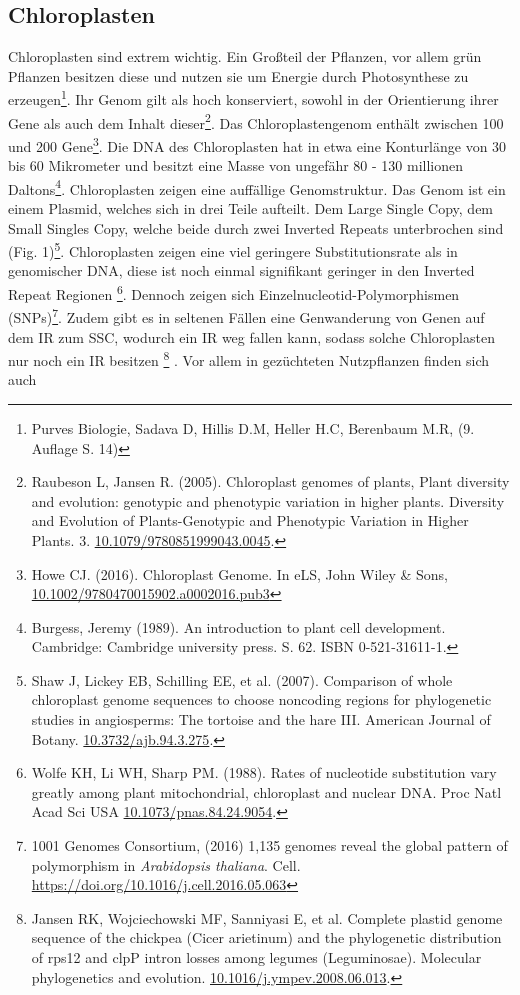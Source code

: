 \documentclass{scrartcl}
\begin{document}
\subsection{Chloroplasten}
\label{sec-2-1}
Chloroplasten sind extrem wichtig. Ein Großteil der Pflanzen, vor allem grün Pflanzen besitzen diese und nutzen sie um Energie durch Photosynthese zu erzeugen\footnote{Purves Biologie, Sadava D, Hillis D.M, Heller H.C, Berenbaum M.R, (9. Auflage S. 14)}.
Ihr Genom gilt als hoch konserviert, sowohl in der Orientierung ihrer Gene als auch dem Inhalt dieser\footnote{Raubeson L, Jansen R. (2005). Chloroplast genomes of plants, Plant diversity and evolution: genotypic and phenotypic variation in higher plants. Diversity and Evolution of Plants-Genotypic and Phenotypic Variation in Higher Plants. 3. \url{10.1079/9780851999043.0045}.}. Das Chloroplastengenom enthält zwischen 100 und 200 Gene\footnote{Howe CJ. (2016). Chloroplast Genome. In eLS, John Wiley \& Sons,  \url{10.1002/9780470015902.a0002016.pub3}}. 
Die DNA des Chloroplasten hat in etwa eine Konturlänge von 30 bis 60 Mikrometer und besitzt eine Masse von ungefähr 80 - 130 millionen Daltons\footnote{Burgess, Jeremy (1989). An introduction to plant cell development. Cambridge: Cambridge university press. S. 62. ISBN 0-521-31611-1.}.
Chloroplasten zeigen
eine auffällige Genomstruktur. Das Genom ist ein einem Plasmid, welches sich in drei Teile aufteilt. Dem Large Single Copy, dem 
Small Singles Copy, welche beide durch zwei Inverted Repeats unterbrochen sind (Fig. 1)\footnote{Shaw J, Lickey EB, Schilling EE, et al. (2007). Comparison of whole chloroplast genome sequences to choose noncoding regions for phylogenetic studies in angiosperms: The tortoise and the hare III. American Journal of Botany. \url{10.3732/ajb.94.3.275}.}. Chloroplasten zeigen eine viel geringere Substitutionsrate
als in genomischer DNA, diese ist noch einmal signifikant geringer in den Inverted Repeat Regionen \footnote{Wolfe KH, Li WH, Sharp PM. (1988). Rates of nucleotide substitution vary greatly among plant mitochondrial, chloroplast and nuclear DNA. Proc Natl Acad Sci USA \url{10.1073/pnas.84.24.9054}.}. Dennoch zeigen sich
Einzelnucleotid-Polymorphismen (SNPs)\footnote{1001 Genomes Consortium, (2016) 1,135 genomes reveal the global pattern of polymorphism in \emph{Arabidopsis thaliana}. Cell. \url{https://doi.org/10.1016/j.cell.2016.05.063}}. Zudem gibt es in seltenen Fällen eine Genwanderung von Genen auf dem IR zum SSC, wodurch ein IR weg
fallen kann, sodass solche Chloroplasten nur noch ein IR besitzen \footnote{Jansen RK, Wojciechowski MF, Sanniyasi E, et al. Complete plastid genome sequence of the chickpea (Cicer arietinum) and the phylogenetic distribution of rps12 and clpP intron losses among legumes (Leguminosae). Molecular phylogenetics and evolution. \url{10.1016/j.ympev.2008.06.013}.} . Vor allem in gezüchteten Nutzpflanzen finden sich auch 
\end{document}
